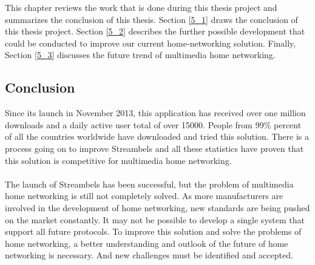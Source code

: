 This chapter reviews the work that is done during this thesis project and
summarizes the conclusion of this thesis. Section \ref{5_1} draws the
conclusion of this thesis project. Section \ref{5_2} describes the further
possible development that could be conducted to improve our current
home-networking solution. Finally, Section \ref{5_3} discusses the future trend
of multimedia home networking.
\subsection{Conclusion\label{5_1}}
Since its launch in November 2013, this application has received over one
million downloads and a daily active user total of over 15000. People from 99\%
percent of all the countries worldwide have downloaded and tried this solution.
There is a process going on to improve Streambels and all these
statistics have proven that this solution is competitive for multimedia home
networking.\\
\\
The launch of Streambels has been successful, but the problem of multimedia
 home networking is still not completely solved. As more manufacturers are
 involved in the development of home networking, new standards are being pushed
 on the market constantly. It may not be possible to develop a single
 system that support all future protocols. To improve this solution and solve
 the problems of home networking, a better understanding and outlook of the
 future of home networking is necessary. And new challenges must be identified
 and accepted.

